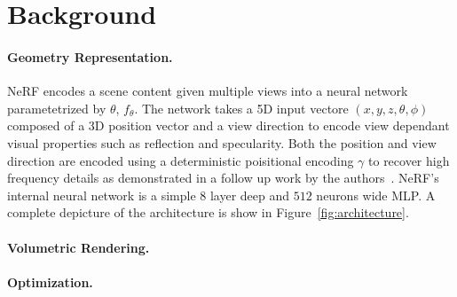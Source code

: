 \documentclass[runningheads]{llncs}
\begin{document}
\section{Background}

\paragraph{\textbf{Geometry Representation.}}
\gls{NeRF} encodes a scene content given multiple views into a neural network parametetrized by $\theta$, $f_{\theta}$. The network takes a 5D input vectore $(x, y, z, \theta, \phi)$ composed of a 3D position vector and a view direction to encode view dependant visual properties such as reflection and specularity. Both the position and view direction are encoded using a deterministic poisitional encoding $\gamma$ to recover high frequency details as demonstrated in a follow up work by the authors~\cite{Tancik2020}. \gls{NeRF}'s internal neural network is a simple $8$ layer deep and $512$ neurons wide \gls{MLP}. A complete depicture of the architecture is show in Figure~\ref{fig:architecture}.

\paragraph{\textbf{Volumetric Rendering.}}

\paragraph{\textbf{Optimization.}}
\end{document}
